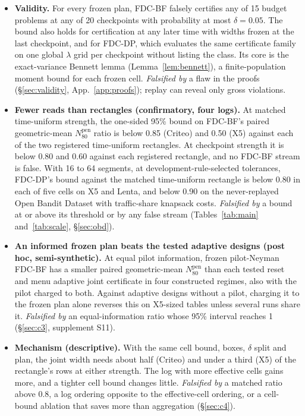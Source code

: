 \documentclass[sigconf,anonymous,review]{acmart}
\newcommand{\Npen}{N_{80}^{\text{pen}}}
\begin{document}
\begin{itemize}
\item[\textbf{C1}] \textbf{Validity.} For every frozen plan, FDC-BF falsely certifies any of 15 budget problems at any of 20 checkpoints with probability at most $\delta = 0.05$. The bound also holds for certification at any later time with widths frozen at the last checkpoint, and for FDC-DP, which evaluates the same certificate family on one global $\lambda$ grid per checkpoint without listing the class. Its core is the exact-variance Bennett lemma (Lemma~\ref{lem:bennett}), a finite-population moment bound for each frozen cell. \emph{Falsified by} a flaw in the proofs (\S\ref{sec:validity}, App.~\ref{app:proofs}); replay can reveal only gross violations.
\item[\textbf{C2}] \textbf{Fewer reads than rectangles (confirmatory, four logs).} At matched time-uniform strength, the one-sided 95\% bound on FDC-BF's paired geometric-mean $\Npen$ ratio is below 0.85 (Criteo) and 0.50 (X5) against each of the two registered time-uniform rectangles. At checkpoint strength it is below 0.80 and 0.60 against each registered rectangle, and no FDC-BF stream is false. With 16 to 64 segments, at development-rule-selected tolerances, FDC-DP's bound against the matched time-uniform rectangle is below 0.80 in each of five cells on X5 and Lenta, and below 0.90 on the never-replayed Open Bandit Dataset with traffic-share knapsack costs. \emph{Falsified by} a bound at or above its threshold or by any false stream (Tables~\ref{tab:main} and~\ref{tab:scale}, \S\ref{sec:obd}).
\item[\textbf{C3}] \textbf{An informed frozen plan beats the tested adaptive designs (post hoc, semi-synthetic).} At equal pilot information, frozen pilot-Neyman FDC-BF has a smaller paired geometric-mean $\Npen$ than each tested reset and menu adaptive joint certificate in four constructed regimes, also with the pilot charged to both. Against adaptive designs without a pilot, charging it to the frozen plan alone reverses this on X5-sized tables unless several runs share it. \emph{Falsified by} an equal-information ratio whose 95\% interval reaches 1 (\S\ref{sec:c3}, supplement S11).
\item[\textbf{C4}] \textbf{Mechanism (descriptive).} With the same cell bound, boxes, $\delta$ split and plan, the joint width needs about half (Criteo) and under a third (X5) of the rectangle's rows at either strength. The log with more effective cells gains more, and a tighter cell bound changes little. \emph{Falsified by} a matched ratio above 0.8, a log ordering opposite to the effective-cell ordering, or a cell-bound ablation that saves more than aggregation (\S\ref{sec:c4}).
\end{itemize}
\end{document}
